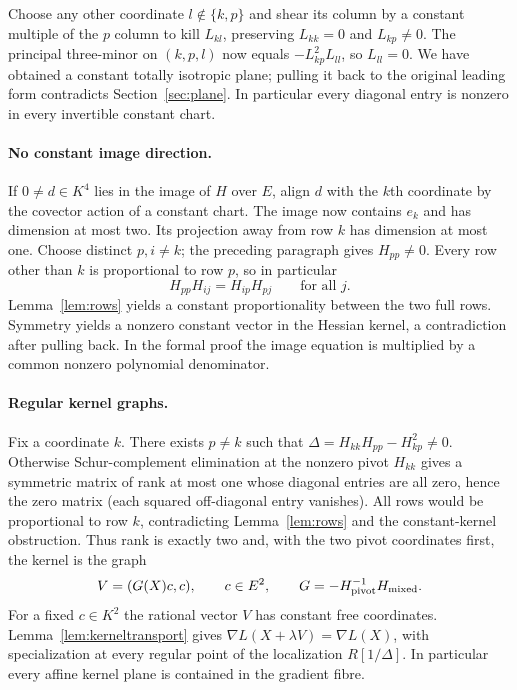 \documentclass[11pt,a4paper]{article}
\begin{document}
Choose any other coordinate $l\notin\{k,p\}$ and shear its column by a constant multiple of the $p$ column to kill $L_{kl}$, preserving $L_{kk}=0$ and $L_{kp}\ne0$. The principal three-minor on $(k,p,l)$ now equals $-L_{kp}^2L_{ll}$, so $L_{ll}=0$. We have obtained a constant totally isotropic plane; pulling it back to the original leading form contradicts Section~\ref{sec:plane}. In particular every diagonal entry is nonzero in every invertible constant chart.

\paragraph{No constant image direction.}
If $0\ne d\in K^4$ lies in the image of $H$ over $E$, align $d$ with the $k$th coordinate by the covector action of a constant chart. The image now contains $e_k$ and has dimension at most two. Its projection away from row $k$ has dimension at most one. Choose distinct $p,i\ne k$; the preceding paragraph gives $H_{pp}\ne0$. Every row other than $k$ is proportional to row $p$, so in particular
\[
 H_{pp}H_{ij}=H_{ip}H_{pj}\qquad\text{for all }j.
\]
Lemma~\ref{lem:rows} yields a constant proportionality between the two full rows. Symmetry yields a nonzero constant vector in the Hessian kernel, a contradiction after pulling back. In the formal proof the image equation is multiplied by a common nonzero polynomial denominator.

\paragraph{Regular kernel graphs.}
Fix a coordinate $k$. There exists $p\ne k$ such that $\Delta=H_{kk}H_{pp}-H_{kp}^2\ne0$. Otherwise Schur-complement elimination at the nonzero pivot $H_{kk}$ gives a symmetric matrix of rank at most one whose diagonal entries are all zero, hence the zero matrix (each squared off-diagonal entry vanishes). All rows would be proportional to row $k$, contradicting Lemma~\ref{lem:rows} and the constant-kernel obstruction. Thus rank is exactly two and, with the two pivot coordinates first, the kernel is the graph
\[
 V=(G(X)c,c),\qquad c\in E^2,\qquad
 G=-H_{\rm pivot}^{-1}H_{\rm mixed}.
\]
For a fixed $c\in K^2$ the rational vector $V$ has constant free coordinates. Lemma~\ref{lem:kerneltransport} gives $\nabla L(X+\lambda V)=\nabla L(X)$, with specialization at every regular point of the localization $R[1/\Delta]$. In particular every affine kernel plane is contained in the gradient fibre.
\end{document}
